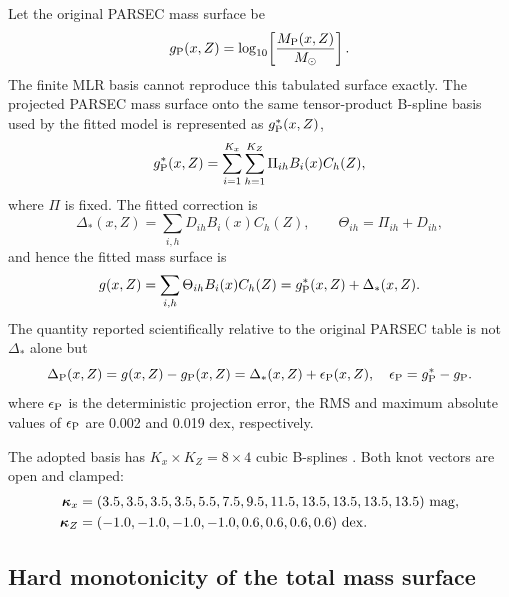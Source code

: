 Let the original PARSEC mass surface be
\begin{equation}
 g_{\rm P}(x,Z)=\log_{10}\!\left[\frac{M_{\rm P}(x,Z)}{M_{\odot}}\right].
\end{equation}
The finite MLR basis cannot reproduce this tabulated surface exactly.  The projected PARSEC mass surface onto the same tensor-product B-spline basis used by the fitted model is represented as $g_{\rm P}^{*}(x,Z)$, 
\begin{equation}
 g_{\rm P}^{*}(x,Z)=\sum_{i=1}^{K_x}\sum_{h=1}^{K_Z}
 \Pi_{ih}B_i(x)C_h(Z),
\end{equation}
where $\Pi$ is fixed.  The fitted correction is
\begin{equation}
 \Delta_*(x,Z)=\sum_{i,h}D_{ih}B_i(x)C_h(Z),
 \qquad \Theta_{ih}=\Pi_{ih}+D_{ih},
\end{equation}
and hence the fitted mass surface is
\begin{equation}
 g(x,Z)=\sum_{i,h}\Theta_{ih}B_i(x)C_h(Z)
       =g_{\rm P}^{*}(x,Z)+\Delta_*(x,Z).
 \label{eq:g-total}
\end{equation}
The quantity reported scientifically relative to the original PARSEC table is
not $\Delta_*$ alone but
\begin{equation}
 \Delta_{\rm P}(x,Z)=g(x,Z)-g_{\rm P}(x,Z)
 =\Delta_*(x,Z)+\epsilon_{\rm P}(x,Z),
 \quad \epsilon_{\rm P}=g_{\rm P}^{*}-g_{\rm P}.
 \label{eq:delta-parsec}
\end{equation}
where $\epsilon_{\rm P}$ is the deterministic projection error, the RMS and maximum absolute values of
$\epsilon_{\rm P}$ are 0.002 and 0.019 dex, respectively.

The adopted basis has $K_x\times K_Z=8\times4$ cubic B-splines
\citep{deBoor2001Splines}.  Both knot vectors are open and clamped:
\begin{align}
 \bm\kappa_x={}&(3.5,3.5,3.5,3.5,5.5,7.5,9.5,11.5,
                  13.5,13.5,13.5,13.5)\ {\rm mag},\\
 \bm\kappa_Z={}&(-1.0,-1.0,-1.0,-1.0,0.6,0.6,0.6,0.6)\ {\rm dex}.
\end{align}

\subsection{Hard monotonicity of the total mass surface}

